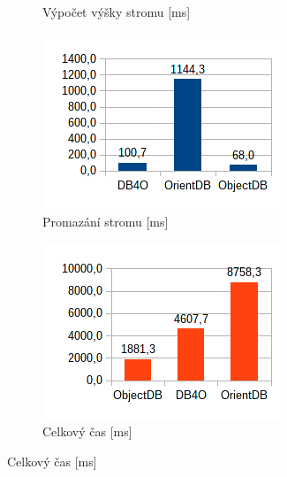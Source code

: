 \begin{figure}[!h]
\begin{subfigure}[b]{0.5\textwidth}
  \caption{Výpočet výšky stromu [ms]}\label{img:oodbms12}
  \end{subfigure}
  \begin{subfigure}[b]{0.5\textwidth}
  \includegraphics[]{obr/bench/oodbms13}
  \caption{Promazání stromu [ms]}\label{img:oodbms13}
  \end{subfigure}
  \begin{subfigure}[b]{0.5\textwidth}
  \includegraphics[]{obr/bench/oodbms14}
  \caption{Celkový čas [ms]}\label{img:oodbms14}
  \end{subfigure}
\end{figure}

